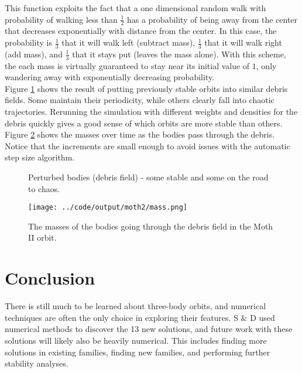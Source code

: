 \documentclass[12pt]{article}
\begin{document}
This function exploits the fact that a one dimensional random walk with probability of walking less than $\frac{1}{2}$ has a probability of being away from the center that decreases exponentially with distance from the center. In this case, the probability is $\frac{1}{3}$ that it will walk left (subtract mass), $\frac{1}{3}$ that it will walk right (add mass), and $\frac{1}{3}$ that it stays put (leaves the mass alone). With this scheme, the each mass is virtually guaranteed to stay near its initial value of $1$, only wandering away with exponentially decreasing probability. \\

Figure \ref{f13} shows the result of putting previously stable orbits into similar debris fields. Some maintain their periodicity, while others clearly fall into chaotic trajectories. Rerunning the simulation with different weights and densities for the debris quickly gives a good sense of which orbits are more stable than others. \\

Figure \ref{f14} shows the masses over time as the bodies pass through the debris. Notice that the increments are small enough to avoid issues with the automatic step size algorithm.

\begin{figure}
 \qquad
{} \qquad
{} \qquad
{} \qquad
{} \qquad
{} \qquad
\caption{Perturbed bodies (debris field) - some stable and some on the road to chaos.}
\label{f13}
\end{figure}

\begin{figure}
\center
\texttt{[image: ../code/output/moth2/mass.png]}
\caption{The masses of the bodies going through the debris field in the Moth II orbit.}
\label{f14}
\end{figure}

\section{Conclusion}
There is still much to be learned about three-body orbits, and numerical techniques are often the only choice in exploring their features. S \& D used numerical methods to discover the 13 new solutions, and future work with these solutions will likely also be heavily numerical. This includes finding more solutions in existing families, finding new families, and performing further stability analyses. \\
\end{document}
